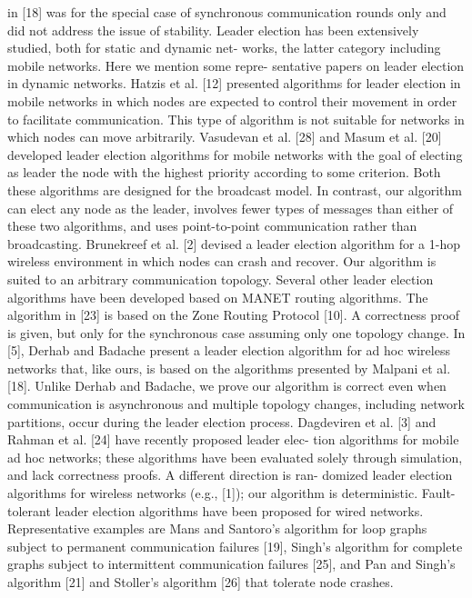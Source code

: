 in [18] was for the special case of synchronous communication rounds only and did
not address the issue of stability.
Leader election has been extensively studied, both for static and dynamic net-
works, the latter category including mobile networks. Here we mention some repre-
sentative papers on leader election in dynamic networks. Hatzis et al. [12] presented
algorithms for leader election in mobile networks in which nodes are expected to
control their movement in order to facilitate communication. This type of algorithm
is not suitable for networks in which nodes can move arbitrarily. Vasudevan et al. [28]
and Masum et al. [20] developed leader election algorithms for mobile networks with
the goal of electing as leader the node with the highest priority according to some
criterion. Both these algorithms are designed for the broadcast model. In contrast,
our algorithm can elect any node as the leader, involves fewer types of messages than
either of these two algorithms, and uses point-to-point communication rather than
broadcasting. Brunekreef et al. [2] devised a leader election algorithm for a 1-hop
wireless environment in which nodes can crash and recover. Our algorithm is suited
to an arbitrary communication topology.
Several other leader election algorithms have been developed based on MANET
routing algorithms. The algorithm in [23] is based on the Zone Routing Protocol
[10]. A correctness proof is given, but only for the synchronous case assuming only
one topology change. In [5], Derhab and Badache present a leader election algorithm
for ad hoc wireless networks that, like ours, is based on the algorithms presented by
Malpani et al. [18]. Unlike Derhab and Badache, we prove our algorithm is correct
even when communication is asynchronous and multiple topology changes, including
network partitions, occur during the leader election process.
Dagdeviren et al. [3] and Rahman et al. [24] have recently proposed leader elec-
tion algorithms for mobile ad hoc networks; these algorithms have been evaluated
solely through simulation, and lack correctness proofs. A different direction is ran-
domized leader election algorithms for wireless networks (e.g., [1]); our algorithm is
deterministic.
Fault-tolerant leader election algorithms have been proposed for wired networks.
Representative examples are Mans and Santoro’s algorithm for loop graphs subject
to permanent communication failures [19], Singh’s algorithm for complete graphs
subject to intermittent communication failures [25], and Pan and Singh’s algorithm
[21] and Stoller’s algorithm [26] that tolerate node crashes.
